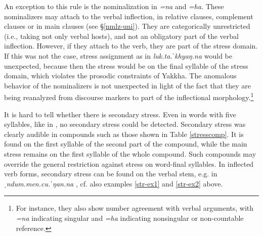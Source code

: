 An exception to this rule is the nominalization in \emph{=na} and \emph{=ha}. These nominalizers may attach to the verbal inflection, in relative clauses, complement clauses or in main clauses (see §\ref{nmlz-uni}). They are categorically unrestricted (i.e., taking not only verbal hosts), and not an obligatory part of the verbal inflection. However, if they attach to the verb, they are part of the stress domain. If this was not the case, stress assignment as in \emph{luk.ta.ˈkhyaŋ.na}  would be unexpected, because then the stress would be on the final syllable of the stress domain, which violates the prosodic constraints of Yakkha. The anomalous behavior of the nominalizers is not unexpected in light of the fact that they are being reanalyzed from discourse markers to part of the inflectional morphology.\footnote{For instance, they also show number agreement with verbal arguments, with \emph{=na} indicating singular and \emph{=ha} indicating nonsingular or non-countable reference.}

It is hard to tell whether there is secondary stress. Even in words with five syllables, like in \Last[b], no secondary stress could be detected.  Secondary stress was clearly audible in compounds such as those shown in Table \ref{stresscomp}.  It is found on the first syllable of the second part of the compound, while the main stress remains on the first syllable of the whole compound. Such compounds may override the general restriction against stress on word-final syllables. In inflected verb forms, secondary stress can be found on the verbal stem, e.g. in \emph{ˌndum.men.cu.ˈŋan.na} , cf. also examples \ref{str-ex1} and \ref{str-ex2} above.

 

 \begin{table}[htp]	
\caption{Stress in compounds}\label{stresscomp}

\end{table}



